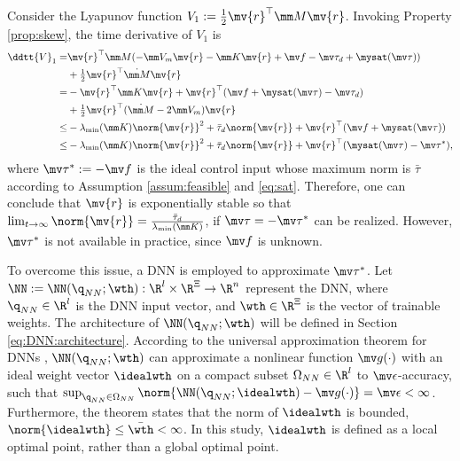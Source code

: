 \documentclass[lettersize,journal]{IEEEtran}
\newcommand*{\fe}{\mv{r}}
\begin{document}
Consider the Lyapunov function $V_1:= \tfrac{1}{2}\fe^\top \mm M\fe$. 
Invoking Property \ref{prop:skew}, the time derivative of $V_1$ is
\begin{equation}
    \begin{aligned}
        \ddtt{V}_1
        =&
        \fe^\top \mm M (
            -\mm V_m \fe -\mm K \fe + \mv f
            -\mv \tau_d + \mysat(\mv\tau)
        )
        \\
        &
        +
        \tfrac{1}{2}
        \fe^\top \dot{\mm M}\fe
        \\
        =&
        -
        \fe^\top \mm K \fe 
        +
        \fe^\top (
            \mv f+\mysat(\mv\tau)
            -\mv \tau_d
        )
        \\
        &
        +
        \tfrac{1}{2}
        \fe^\top(\dot{\mm M}- 2\mm V_m)\fe
        \\
        \le&
        -\lambda_\text{min}(\mm K)\norm{\fe}^2
        +
        \bar\tau_d\norm{\fe}
        +
        \fe^\top (\mv f+\mysat(\mv \tau))
        \\
        \le&
        -\lambda_\text{min}(\mm K)\norm{\fe}^2
        +
        \bar\tau_d\norm{\fe}
        +
        \fe^\top (\mysat(\mv\tau)-\mv\tau^*)
        ,
    \end{aligned}
    \label{eq:lya1:dot1}
\end{equation}
where $\mv\tau^*:= -\mv f$ is the ideal control input whose maximum norm is $\bar\tau$ according to Assumption \ref{assum:feasible} and \eqref{eq:sat}. 
Therefore, one can conclude that $\fe$ is exponentially stable so that $\lim_{t\to\infty}\norm{\fe}=\tfrac{\bar\tau_d}{\lambda_\text{min}(\mm K)}$, if $\mv \tau=-\mv\tau^*$ can be realized.
However, $\mv \tau^*$ is not available in practice, since $\mv f$ is unknown.

To overcome this issue, a DNN is employed to approximate $\mv\tau^*$.
Let $\NN:=\NN(\q_{NN};\wth): \R^{l}\times\R^{\Xi}\to\R^{n}$ represent the DNN, where $\q_{NN}\in\R^{l}$ is the DNN input vector, and $\wth\in\R^{\Xi}$ is the vector of trainable weights.
The architecture of $\NN(\q_{NN};\wth)$ will be defined in Section \ref{eq:DNN:architecture}.
According to the universal approximation theorem for DNNs \cite{Kidger:2020aa}, $\NN(\q_{NN};\wth)$ can approximate a nonlinear function $\mv g(\cdot)$ with an ideal weight vector $\idealwth$ on a compact subset $\Omega_{NN}\in\R^{l}$ to $\mv\epsilon$-accuracy, such that $\sup_{\q_{NN}\in\Omega_{NN}}\norm{ \NN(\q_{NN};\idealwth) - \mv g(\cdot)} = \mv\epsilon < \infty$.
Furthermore, the theorem states that the norm of $\idealwth$ is bounded, \ie $\norm{\idealwth}\le \bar\wth<\infty$.
In this study, $\idealwth$ is defined as a local optimal point, rather than a global optimal point.
\end{document}
